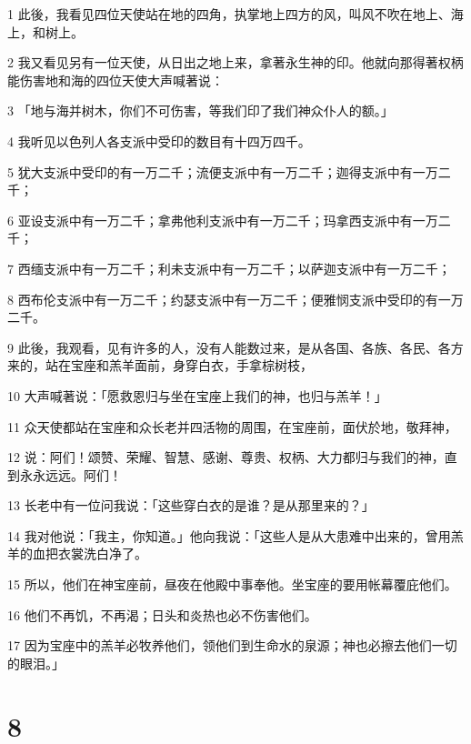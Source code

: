 \par 1 此後，我看见四位天使站在地的四角，执掌地上四方的风，叫风不吹在地上、海上，和树上。
\par 2 我又看见另有一位天使，从日出之地上来，拿著永生神的印。他就向那得著权柄能伤害地和海的四位天使大声喊著说：
\par 3 「地与海并树木，你们不可伤害，等我们印了我们神众仆人的额。」
\par 4 我听见以色列人各支派中受印的数目有十四万四千。
\par 5 犹大支派中受印的有一万二千；流便支派中有一万二千；迦得支派中有一万二千；
\par 6 亚设支派中有一万二千；拿弗他利支派中有一万二千；玛拿西支派中有一万二千；
\par 7 西缅支派中有一万二千；利未支派中有一万二千；以萨迦支派中有一万二千；
\par 8 西布伦支派中有一万二千；约瑟支派中有一万二千；便雅悯支派中受印的有一万二千。
\par 9 此後，我观看，见有许多的人，没有人能数过来，是从各国、各族、各民、各方来的，站在宝座和羔羊面前，身穿白衣，手拿棕树枝，
\par 10 大声喊著说：「愿救恩归与坐在宝座上我们的神，也归与羔羊！」
\par 11 众天使都站在宝座和众长老并四活物的周围，在宝座前，面伏於地，敬拜神，
\par 12 说：阿们！颂赞、荣耀、智慧、感谢、尊贵、权柄、大力都归与我们的神，直到永永远远。阿们！
\par 13 长老中有一位问我说：「这些穿白衣的是谁？是从那里来的？」
\par 14 我对他说：「我主，你知道。」他向我说：「这些人是从大患难中出来的，曾用羔羊的血把衣裳洗白净了。
\par 15 所以，他们在神宝座前，昼夜在他殿中事奉他。坐宝座的要用帐幕覆庇他们。
\par 16 他们不再饥，不再渴；日头和炎热也必不伤害他们。
\par 17 因为宝座中的羔羊必牧养他们，领他们到生命水的泉源；神也必擦去他们一切的眼泪。」

\chapter{8}


